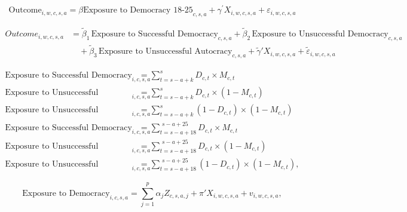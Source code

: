 \documentclass[11pt]{article}
\begin{document}
\begin{equation}
	\label{2}
	\text{Outcome}_{i,w,c,s,a} = \beta \text{Exposure to Democracy 18-25}_{c,s,a} + \gamma^{\prime}X_{i,w,c,s,a} + \varepsilon_{i,w,c,s,a} 
\end{equation}

\begin{equation}
	\label{3}
	\begin{aligned}
		Outcome_{i,w,c,s,a} 
		&= \tilde{\beta}_{1} \, \text{Exposure to Successful Democracy}_{c,s,a} 
		+ \tilde{\beta}_{2} \, \text{Exposure to Unsuccessful Democracy}_{c,s,a} \\
		&\quad + \tilde{\beta}_{3} \, \text{Exposure to Unsuccessful Autocracy}_{c,s,a} 
		+ \tilde{\gamma}' X_{i,w,c,s,a} 
		+ \tilde{\varepsilon}_{i,w,c,s,a}
	\end{aligned}
\end{equation}

\begin{equation}
	\label{4}
	\begin{aligned}
		\text{Exposure to Successful Democracy}_{i,c,s,a} 
		&= \sum_{t=s-a+k}^{s} D_{c,t} \times M_{c,t} \\[1em]
		\text{Exposure to Unsuccessful Democracy}_{i,c,s,a} 
		&= \sum_{t=s-a+k}^{s} D_{c,t} \times (1 - M_{c,t}) \\[1em]
		\text{Exposure to Unsuccessful Autocracy}_{i,c,s,a} 
		&= \sum_{t=s-a+k}^{s} (1 - D_{c,t}) \times (1 - M_{c,t}) \\[1em]
		\text{Exposure to Successful Democracy 18--25}_{i,c,s,a} 
		&= \sum_{t = s-a+18}^{\,\,s-a+25} D_{c,t} \times M_{c,t} \\[1em]
		\text{Exposure to Unsuccessful Democracy 18--25}_{i,c,s,a} 
		&= \sum_{t = s-a+18}^{\,\,s-a+25} D_{c,t} \times (1 - M_{c,t}) \\[1em]
		\text{Exposure to Unsuccessful Autocracy 18--25}_{i,c,s,a} 
		&= \sum_{t = s-a+18}^{\,\,s-a+25} (1 - D_{c,t}) \times (1 - M_{c,t}),
	\end{aligned}
\end{equation}

\begin{equation}
	\label{5}
	\text{Exposure to Democracy}_{i,c,s,a}
	= \sum_{j=1}^{p} \alpha_j Z_{c,s,a,j} + \pi' X_{i,w,c,s,a} + v_{i,w,c,s,a},
\end{equation}

\setcounter{figure}{0}
\renewcommand{\thefigure}{O\arabic{figure}}
\setcounter{table}{0}
\renewcommand{\thetable}{O\arabic{table}}
\end{document}
